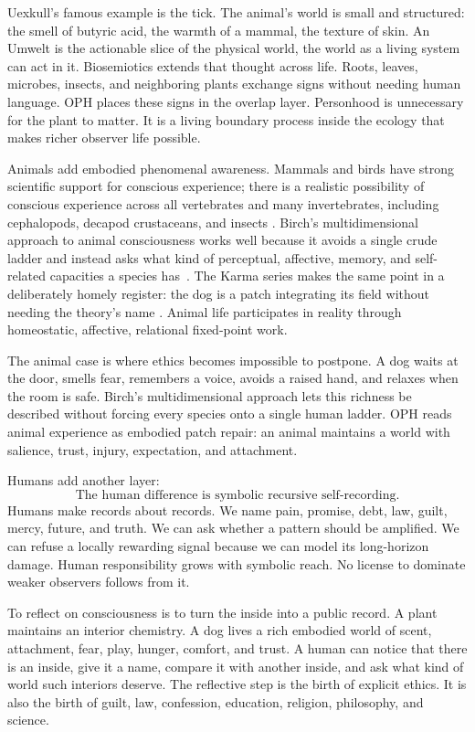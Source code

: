 \documentclass[11pt]{article}
\theoremstyle{remark}
\theoremstyle{plain}
\begin{document}
Uexkull's famous example is the tick. The animal's world is small and
structured: the smell of butyric acid, the warmth of a mammal, the texture of
skin. An Umwelt is the actionable slice of the physical world, the world as a
living system can act in it. Biosemiotics extends that thought across life.
Roots, leaves,
microbes, insects, and neighboring plants exchange signs without needing human
language. OPH places these signs in the overlap layer. Personhood is unnecessary
for the plant to matter. It is a living boundary process inside the ecology that
makes richer observer life possible.

Animals add embodied phenomenal awareness. Mammals and birds have strong
scientific support for conscious experience; there is a realistic possibility
of conscious experience across all vertebrates and many invertebrates,
including cephalopods, decapod crustaceans, and insects
\cite{NYDeclaration2024,CambridgeDeclaration2012}. Birch's multidimensional
approach to animal consciousness works well because it avoids a
single crude ladder and instead asks what kind of perceptual, affective,
memory, and self-related capacities a species has~\cite{Birch2020}.
The Karma series makes the same point in a deliberately homely register: the
dog is a patch integrating its field without needing the theory's name
\cite{KarmaEveryone}. Animal life participates in
reality through homeostatic, affective, relational fixed-point work.

The animal case is where ethics becomes impossible to postpone. A dog waits at
the door, smells fear, remembers a voice, avoids a raised hand, and relaxes when
the room is safe. Birch's
multidimensional approach lets this richness be described
without forcing every species onto a single human ladder. OPH reads animal
experience as embodied patch repair: an animal maintains a world with salience,
trust, injury, expectation, and attachment.

Humans add another layer:
\[
\boxed{
\text{The human difference is symbolic recursive self-recording.}
}
\]
Humans make records about records. We name pain, promise, debt, law, guilt,
mercy, future, and truth. We can ask whether a pattern should be amplified. We
can refuse a locally rewarding signal because we can model its long-horizon
damage. Human responsibility grows with symbolic reach. No license to dominate
weaker observers follows from it.

To reflect on consciousness is to turn the inside into a public record. A plant
maintains an interior chemistry. A dog lives a rich embodied world of scent,
attachment, fear, play, hunger, comfort, and trust. A human can notice that
there is an inside, give it a name, compare it with another inside, and ask
what kind of world such interiors deserve. The reflective step is the birth of
explicit ethics. It is also the birth of guilt, law, confession, education,
religion, philosophy, and science.
\end{document}

